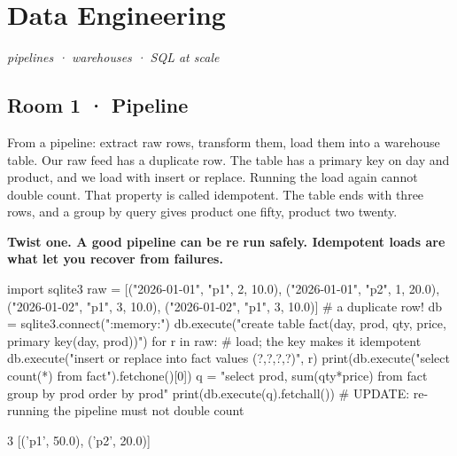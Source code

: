 \documentclass[11pt,a4paper]{report}
\begin{document}
\chapter{Data Engineering}
\textit{pipelines · warehouses · SQL at scale}
\section*{Room 1 · Pipeline}
From a pipeline: extract raw rows, transform them, load them into a warehouse table. Our raw feed has a duplicate row. The table has a primary key on day and product, and we load with insert or replace. Running the load again cannot double count. That property is called idempotent. The table ends with three rows, and a group by query gives product one fifty, product two twenty.
\begin{tcolorbox}[colback=yellow!12,colframe=orange!70!black,boxrule=0.4pt,left=4pt,right=4pt,top=2pt,bottom=2pt]\textbf{Twist one. A good pipeline can be re run safely. Idempotent loads are what let you recover from failures.}\end{tcolorbox}
\begin{Code}
import sqlite3
raw = [("2026-01-01", "p1", 2, 10.0), ("2026-01-01", "p2", 1, 20.0),
       ("2026-01-02", "p1", 3, 10.0), ("2026-01-02", "p1", 3, 10.0)]   # a duplicate row!
db = sqlite3.connect(":memory:")
db.execute("create table fact(day, prod, qty, price, primary key(day, prod))")
for r in raw:                               # load; the key makes it idempotent
    db.execute("insert or replace into fact values (?,?,?,?)", r)
print(db.execute("select count(*) from fact").fetchone()[0])
q = "select prod, sum(qty*price) from fact group by prod order by prod"
print(db.execute(q).fetchall())
# UPDATE: re-running the pipeline must not double count
\end{Code}
\begin{Out}
3
[('p1', 50.0), ('p2', 20.0)]
\end{Out}
\end{document}
